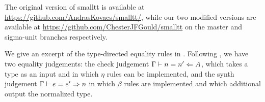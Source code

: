 

The original version of smalltt is available at \url{https://github.com/AndrasKovacs/smalltt/}, while our two modified versions are available at \url{https://github.com/ChesterJFGould/smalltt} on the master and sigma-unit branches respectively.


We give an excerpt of the type-directed equality rules in .
Following \citet{Chapman2005}, we have two equality judgements: the check judgement $\Gamma \vdash n = n' \Leftarrow A$, which takes a type as an input and in which $\eta$ rules can be implemented, and the synth judgement $\Gamma \vdash e = e' \Rightarrow n$ in which $\beta$ rules are implemented and which additional output the normalized type.

